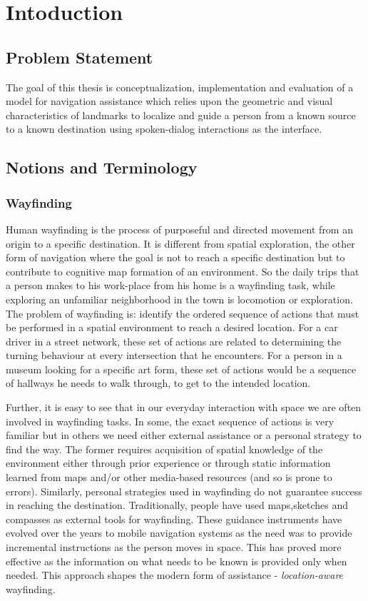 \documentclass{iitkthesis}
\begin{document}
\chapter{Intoduction}
\setcounter{page}{1}
\section{Problem Statement}
The goal of this thesis is conceptualization, implementation and evaluation of a model for navigation assistance which relies upon the geometric and visual characteristics of landmarks to localize and guide a person from a known source to a known destination using spoken-dialog interactions as the interface.
\section{Notions and Terminology}
\subsection{Wayfinding}
Human wayfinding is the process of purposeful and directed movement from 
an origin to a specific destination. It is different from spatial 
exploration, the other form of navigation where 
the goal is not to reach a specific destination but to contribute to 
cognitive map formation of an environment. So the daily trips that a 
person makes to his work-place from his home is a wayfinding task, while 
exploring an unfamiliar neighborhood in the town is locomotion or 
exploration. The problem of wayfinding is: identify the ordered 
sequence of actions that must be performed in a spatial environment to reach 
a desired location. For a car driver in a street network, these set of 
actions are related to determining the turning behaviour at every 
intersection that he encounters. For a person in a museum looking for a 
specific art form, these set of actions would be a sequence of hallways 
he needs to walk through, to get to the intended location. 

Further, it is easy to see that in our everyday interaction with space 
we are often involved in wayfinding tasks. In some, the exact sequence of 
actions is very familiar but in 
others we need either external assistance or a personal strategy to 
find the way. The former requires acquisition of spatial knowledge 
of the environment either through prior experience or through static 
information learned from maps and/or other media-based resources (and so 
is prone to errors). Similarly, personal strategies used in wayfinding do 
not guarantee success in reaching the destination. Traditionally, 
people have used maps,sketches and compasses as external tools for 
wayfinding. These guidance instruments have evolved over the years to 
mobile navigation systems as the need was to provide incremental 
instructions as the person moves in space. This has 
proved more effective as the information on what needs to be known 
is provided only when needed. This approach shapes the 
modern form of assistance - \textit{location-aware} wayfinding. 
\end{document}
